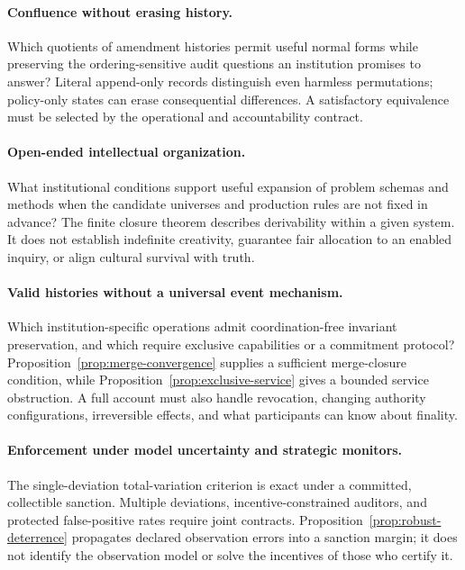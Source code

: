 \documentclass[11pt,letterpaper]{article}
\theoremstyle{plain}
\theoremstyle{definition}
\theoremstyle{remark}
\begin{document}
\paragraph{Confluence without erasing history.}
Which quotients of amendment histories permit useful normal forms while preserving the ordering-sensitive audit questions an institution promises to answer? Literal append-only records distinguish even harmless permutations; policy-only states can erase consequential differences. A satisfactory equivalence must be selected by the operational and accountability contract.

\paragraph{Open-ended intellectual organization.}
What institutional conditions support useful expansion of problem schemas and methods when the candidate universes and production rules are not fixed in advance? The finite closure theorem describes derivability within a given system. It does not establish indefinite creativity, guarantee fair allocation to an enabled inquiry, or align cultural survival with truth.

\paragraph{Valid histories without a universal event mechanism.}
Which institution-specific operations admit coordination-free invariant preservation, and which require exclusive capabilities or a commitment protocol? Proposition~\ref{prop:merge-convergence} supplies a sufficient merge-closure condition, while Proposition~\ref{prop:exclusive-service} gives a bounded service obstruction. A full account must also handle revocation, changing authority configurations, irreversible effects, and what participants can know about finality.

\paragraph{Enforcement under model uncertainty and strategic monitors.}
The single-deviation total-variation criterion is exact under a committed, collectible sanction. Multiple deviations, incentive-constrained auditors, and protected false-positive rates require joint contracts. Proposition~\ref{prop:robust-deterrence} propagates declared observation errors into a sanction margin; it does not identify the observation model or solve the incentives of those who certify it.
\end{document}
